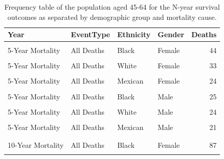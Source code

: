 \documentclass[
]{article}
\begin{document}
\begin{table}[!h]
\centering
\caption{\label{tab:DeathFreq1}Frequency table of the population aged 45-64 for the N-year survival outcomes as separated by demographic group and mortality cause.}
\centering
\begin{tabular}[t]{llllr}
\toprule
Year & EventType & Ethnicity & Gender & Deaths\\
\midrule
\cellcolor{gray!10}{5-Year Mortality} & \cellcolor{gray!10}{CVD} & \cellcolor{gray!10}{Black} & \cellcolor{gray!10}{Female} & \cellcolor{gray!10}{15}\\
5-Year Mortality & All Deaths & Black & Female & 44\\
\cellcolor{gray!10}{5-Year Mortality} & \cellcolor{gray!10}{CVD} & \cellcolor{gray!10}{White} & \cellcolor{gray!10}{Female} & \cellcolor{gray!10}{9}\\
5-Year Mortality & All Deaths & White & Female & 33\\
\cellcolor{gray!10}{5-Year Mortality} & \cellcolor{gray!10}{CVD} & \cellcolor{gray!10}{Mexican} & \cellcolor{gray!10}{Female} & \cellcolor{gray!10}{9}\\
5-Year Mortality & All Deaths & Mexican & Female & 24\\
\cellcolor{gray!10}{5-Year Mortality} & \cellcolor{gray!10}{CVD} & \cellcolor{gray!10}{Black} & \cellcolor{gray!10}{Male} & \cellcolor{gray!10}{6}\\
5-Year Mortality & All Deaths & Black & Male & 25\\
\cellcolor{gray!10}{5-Year Mortality} & \cellcolor{gray!10}{CVD} & \cellcolor{gray!10}{White} & \cellcolor{gray!10}{Male} & \cellcolor{gray!10}{7}\\
5-Year Mortality & All Deaths & White & Male & 24\\
\cellcolor{gray!10}{5-Year Mortality} & \cellcolor{gray!10}{CVD} & \cellcolor{gray!10}{Mexican} & \cellcolor{gray!10}{Male} & \cellcolor{gray!10}{6}\\
5-Year Mortality & All Deaths & Mexican & Male & 21\\
\addlinespace\\
\cellcolor{gray!10}{10-Year Mortality} & \cellcolor{gray!10}{CVD} & \cellcolor{gray!10}{Black} & \cellcolor{gray!10}{Female} & \cellcolor{gray!10}{23}\\
10-Year Mortality & All Deaths & Black & Female & 87\\
\cellcolor{gray!10}{10-Year Mortality} & \cellcolor{gray!10}{CVD} & \cellcolor{gray!10}{White} & \cellcolor{gray!10}{Female} & \cellcolor{gray!10}{21}\\

\end{tabular}
\end{table}
\end{document}
